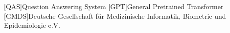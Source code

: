 \begin{acronym}[SPARQL]
    [QAS]{Question Answering System}
    [GPT]{General Pretrained Transformer}
    [GMDS]{Deutsche Gesellschaft für Medizinische Informatik, Biometrie und Epidemiologie e.V.}
\end{acronym}
